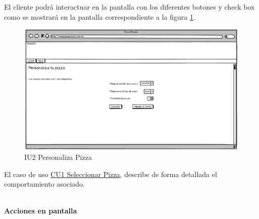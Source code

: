 	El cliente podrá interactuar en la pantalla con los diferentes botones y check box como se mostrará en la pantalla correspondiente a la figura \ref{IU2}.
	\begin{figure}[h]
		
		\begin{center}				
			
			\includegraphics[scale=0.50]{./imagenes/IUs/RegistroSolicitantes/iu1-IniciarSesion/IU2-PersonalizaPizza.png}
			\caption{IU2 Personaliza Pizza}
			\label{IU2}
			
		\end{center}
		
	\end{figure}
	
	
	El caso de uso \hyperlink{CU1}{CU1 Seleccionar Pizza}, describe de forma detallada el comportamiento asociado.
	
	\noindent \textbf{\\Acciones en pantalla}
	
